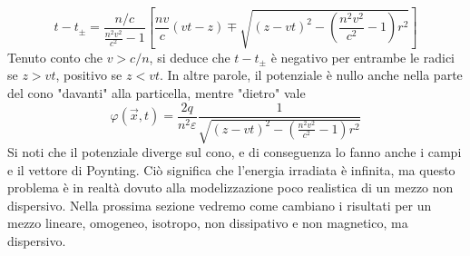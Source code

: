 \documentclass{article}
\begin{document}
	\[t-t_\pm=\frac{n/c}{\frac{n^2v^2}{c^2}-1}\left[\frac{nv}{c}(vt-z)\mp\sqrt{(z-vt)^2-\left(\frac{n^2v^2}{c^2}-1\right)r^2}\right]\]
	Tenuto conto che $v>c/n$, si deduce che $t-t_\pm$ è negativo per entrambe le radici se $z>vt$, positivo se $z<vt$. In altre parole, il potenziale è nullo anche nella parte del cono "davanti" alla particella, mentre "dietro" vale
	\[\varphi(\vec{x},t)=\frac{2q}{n^2\varepsilon}\frac{1}{\sqrt{(z-vt)^2-\left(\frac{n^2v^2}{c^2}-1\right)r^2}}\]
	Si noti che il potenziale diverge sul cono, e di conseguenza lo fanno anche i campi e il vettore di Poynting. Ciò significa che l'energia irradiata è infinita, ma questo problema è in realtà dovuto alla modelizzazione poco realistica di un mezzo non dispersivo. Nella prossima sezione vedremo come cambiano i risultati per un mezzo lineare, omogeneo, isotropo, non dissipativo e non magnetico, ma dispersivo.
\end{document}
